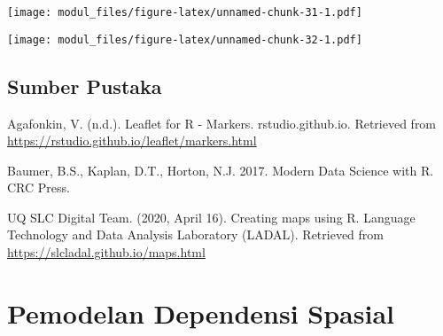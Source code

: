 \documentclass[
]{book}
\newenvironment{Shaded}{\begin{snugshade}}{\end{snugshade}}
\newcommand{\DataTypeTok}[1]{\textcolor[rgb]{0.13,0.29,0.53}{#1}}
\newcommand{\DecValTok}[1]{\textcolor[rgb]{0.00,0.00,0.81}{#1}}
\newcommand{\KeywordTok}[1]{\textcolor[rgb]{0.13,0.29,0.53}{\textbf{#1}}}
\newcommand{\NormalTok}[1]{#1}
\newcommand{\OperatorTok}[1]{\textcolor[rgb]{0.81,0.36,0.00}{\textbf{#1}}}
\newcommand{\StringTok}[1]{\textcolor[rgb]{0.31,0.60,0.02}{#1}}
\begin{document}
\begin{Shaded}
\end{Shaded}

\texttt{[image: modul\_files/figure-latex/unnamed-chunk-31-1.pdf]}

\begin{Shaded}
\end{Shaded}

\texttt{[image: modul\_files/figure-latex/unnamed-chunk-32-1.pdf]}

\hypertarget{sumber-pustaka}{%
\section{Sumber Pustaka}\label{sumber-pustaka}}

Agafonkin, V. (n.d.). Leaflet for R - Markers. rstudio.github.io. Retrieved from \url{https://rstudio.github.io/leaflet/markers.html}

Baumer, B.S., Kaplan, D.T., Horton, N.J. 2017. Modern Data Science with R. CRC Press.

UQ SLC Digital Team. (2020, April 16). Creating maps using R. Language Technology and Data Analysis Laboratory (LADAL). Retrieved from \url{https://slcladal.github.io/maps.html}

\hypertarget{pemodelan-dependensi-spasial}{%
\chapter{Pemodelan Dependensi Spasial}\label{pemodelan-dependensi-spasial}}
\end{document}
